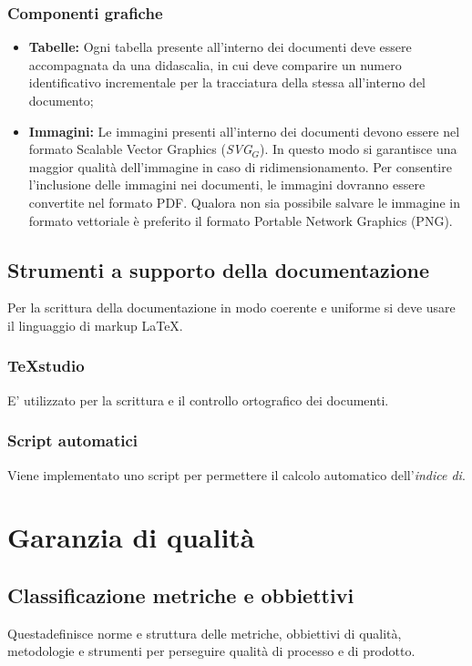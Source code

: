 \subsubsection{Componenti grafiche}
	\begin{itemize}
	\item \textbf{Tabelle:} 
	Ogni tabella presente all'interno dei documenti deve essere accompagnata da una didascalia,	in cui deve comparire un numero identificativo incrementale per la tracciatura della stessa all'interno del documento;
	\item \textbf{Immagini:}
	Le immagini presenti all'interno dei documenti devono essere nel formato Scalable Vector Graphics (\textit{SVG$_{G}$}). In questo modo si garantisce una maggior qualità dell'immagine in caso di ridimensionamento. Per consentire l’inclusione delle immagini nei documenti,
	le immagini dovranno essere convertite nel formato PDF. Qualora non sia possibile
	salvare le immagine in formato vettoriale è preferito il formato Portable Network
	Graphics (PNG).
	\end{itemize}
\subsection{Strumenti a supporto della documentazione}
Per la scrittura della documentazione in modo coerente e uniforme si deve usare il linguaggio di markup \LaTeX.
\subsubsection{TeXstudio}
E' utilizzato per la scrittura e il controllo ortografico dei documenti.
\subsubsection{Script automatici}
Viene implementato uno script per permettere il calcolo automatico dell'\textit{indice di}.

\section{Garanzia di qualità}
\subsection{Classificazione metriche e obbiettivi}
Questadefinisce norme e struttura delle metriche, obbiettivi di qualità, metodologie e strumenti per perseguire qualità di processo e di prodotto. 
